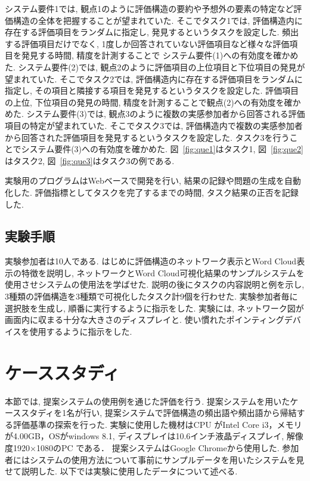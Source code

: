\documentclass[syuuron]{kuee}
\begin{document}
			システム要件1では, 観点1のように評価構造の要約や予想外の要素の特定など評価構造の全体を把握することが望まれていた. 
			そこでタスク1では, 評価構造内に存在する評価項目をランダムに指定し, 発見するというタスクを設定した. 
			頻出する評価項目だけでなく, 1度しか回答されていない評価項目など様々な評価項目を発見する時間, 精度を計測することで
			システム要件(1)への有効度を確かめた. 
			システム要件(2)では, 観点2のように評価項目の上位項目と下位項目の発見が望まれていた. 
			そこでタスク2では, 評価構造内に存在する評価項目をランダムに指定し, その項目と隣接する項目を発見するというタスクを設定した. 
			評価項目の上位, 下位項目の発見の時間, 精度を計測することで観点(2)への有効度を確かめた. 
			システム要件(3)では, 観点3のように複数の実感参加者から回答される評価項目の特定が望まれていた. 
			そこでタスク3では, 評価構造内で複数の実感参加者から回答された評価項目を発見するというタスクを設定した. 
			タスク3を行うことでシステム要件(3)への有効度を確かめた. 
			図~\ref{fig:que1}はタスク1, 図~\ref{fig:que2}はタスク2, 
			図~\ref{fig:que3}はタスク3の例である. 
			
			実験用のプログラムはWebベースで開発を行い, 結果の記録や問題の生成を自動化した. 
			評価指標としてタスクを完了するまでの時間, タスク結果の正否を記録した. 
		
		\subsection{実験手順}
			実験参加者は10人である. 
			はじめに評価構造のネットワーク表示とWord Cloud表示の特徴を説明し, 
			ネットワークとWord Cloud可視化結果のサンプルシステムを使用させシステムの使用法を学ばせた. 
			説明の後にタスクの内容説明と例を示し, 3種類の評価構造を3種類で可視化したタスク計9個を行わせた. 
			実験参加者毎に選択肢を生成し, 順番に実行するように指示をした. 
			実験には, ネットワーク図が画面内に収まる十分な大きさのディスプレイと. 使い慣れたポインティングデバイスを使用するように指示をした. 
		
	\section{ケーススタディ}
		本節では, 提案システムの使用例を通じた評価を行う. 
		提案システムを用いたケーススタディを1名が行い, 提案システムで評価構造の頻出語や頻出語から帰結する評価基準の探索を行った. 
		実験に使用した機材はCPU がIntel Core i3，メモリが4.00GB，OSがwindows 8.1, ディスプレイは10.6インチ液晶ディスプレイ, 解像度1920×1080のPC である．
		提案システムはGoogle Chromeから使用した. 
		参加者にはシステムの使用方法について事前にサンプルデータを用いたシステムを見せて説明した. 以下では実験に使用したデータについて述べる. 
		
\end{document}
